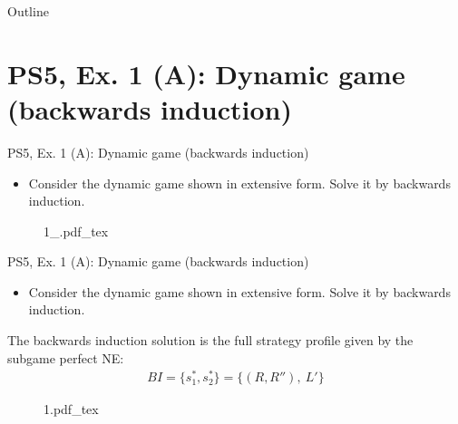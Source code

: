 

\maketitle

  \newcommand{\intuition}[1]{#1} %


\begin{frame}{Outline}
    \tableofcontents
\end{frame}



\section{PS5, Ex. 1 (A): Dynamic game (backwards induction)}

\begin{frame}{PS5, Ex. 1 (A): Dynamic game (backwards induction)}
  \begin{multicols}{2}
    \begin{itemize}
      \item Consider the dynamic game shown in extensive form. Solve it by backwards induction.
    \end{itemize}
    \vfill\null \columnbreak
    \begin{figure}[!h]
      \center
      \def\svgwidth{.8\columnwidth}
      {1_.pdf_tex}
    \end{figure}
    \vfill\null
  \end{multicols}
\end{frame}

\begin{frame}{PS5, Ex. 1 (A): Dynamic game (backwards induction)}
  \begin{multicols}{2}
    \begin{itemize}
      \item Consider the dynamic game shown in extensive form. Solve it by backwards induction.
    \end{itemize}
    The backwards induction solution is the full strategy profile given by the subgame perfect NE:
    \begin{align*}
      BI=\{s_1^{*},s_2^{*}\}=\{(R, R''),\ L'\}
    \end{align*}
    \vfill\null \columnbreak
    \begin{figure}[!h]
      \center
      \def\svgwidth{.8\columnwidth}
      {1.pdf_tex}
    \end{figure}
    \vfill\null
  \end{multicols}
\end{frame}



